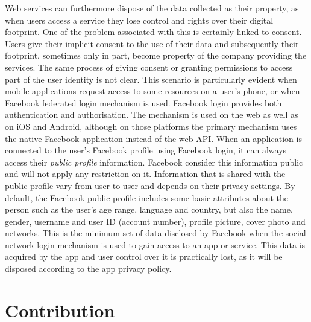 Web services can furthermore dispose of the data collected as their property, as when users access a service they lose control and rights over their digital footprint. One of the problem associated with this is certainly linked to consent. Users give their implicit consent to the use of their data and subsequently their footprint, sometimes only in part, become property of the company providing the services. The same process of giving consent or granting permissions to access part of the user identity is not clear. This scenario is particularly evident when mobile applications request access to some resources on a user's phone, or when Facebook federated login mechanism is used. Facebook login provides both authentication and authorisation. The mechanism is used on the web as well as on iOS and Android, although on those platforms the primary mechanism uses the native Facebook application instead of the web API. When an application is connected to the user's Facebook profile using Facebook login, it can always access their \emph{public profile} information. Facebook consider this information public and will not apply any restriction on it. Information that is shared with the public profile vary from user to user and depends on their privacy settings. By default, the Facebook public profile includes some basic attributes about the person such as the user's age range, language and country, but also the name, gender, username and user ID (account number), profile picture, cover photo and networks. This is the minimum set of data disclosed by Facebook when the social network login mechanism is used to gain access to an app or service. This data is acquired by the app and user control over it is practically lost, as it will be disposed according to the app privacy policy.

\section{Contribution}

